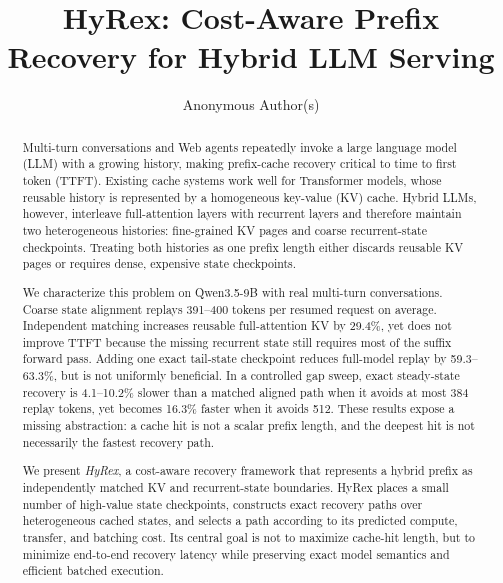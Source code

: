 \documentclass[sigconf,anonymous,review]{acmart}
\begin{document}
\title{HyRex: Cost-Aware Prefix Recovery for Hybrid LLM Serving}

\author{Anonymous Author(s)}

\begin{abstract}
Multi-turn conversations and Web agents repeatedly invoke a large language
model (LLM) with a growing history, making prefix-cache recovery critical to
time to first token (TTFT).  Existing cache systems work well for Transformer
models, whose reusable history is represented by a homogeneous key-value (KV)
cache.  Hybrid LLMs, however, interleave full-attention layers with recurrent
layers and therefore maintain two heterogeneous histories: fine-grained KV
pages and coarse recurrent-state checkpoints.  Treating both histories as one
prefix length either discards reusable KV pages or requires dense, expensive
state checkpoints.

We characterize this problem on Qwen3.5-9B with real multi-turn conversations.
Coarse state alignment replays 391--400 tokens per resumed request on average.
Independent matching increases reusable full-attention KV by 29.4\%, yet does
not improve TTFT because the missing recurrent state still requires most of
the suffix forward pass.  Adding one exact tail-state checkpoint reduces
full-model replay by 59.3--63.3\%, but is not uniformly beneficial.  In a
controlled gap sweep, exact steady-state recovery is 4.1--10.2\% slower than a
matched aligned path when it avoids at most 384 replay tokens, yet becomes
16.3\% faster when it avoids 512.  These results expose a missing abstraction:
a cache hit is not a scalar prefix length, and the deepest hit is not
necessarily the fastest recovery path.

We present \emph{HyRex}, a cost-aware recovery framework that represents a
hybrid prefix as independently matched KV and recurrent-state boundaries.
HyRex places a small number of high-value state checkpoints, constructs exact
recovery paths over heterogeneous cached states, and selects a path according
to its predicted compute, transfer, and batching cost.  Its central goal is
not to maximize cache-hit length, but to minimize end-to-end recovery latency
while preserving exact model semantics and efficient batched execution.
\end{abstract}

\end{document}
